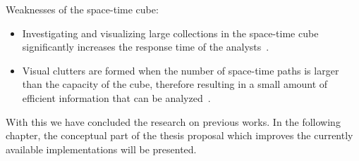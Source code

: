Weaknesses of the space-time cube:
\begin{itemize}
    \item Investigating and visualizing large collections in the space-time cube significantly increases the response time
    of the analysts~\citep{windhager2020many}.
    \item Visual clutters are formed when the number of space-time paths is larger than the capacity of the cube,
    therefore resulting in a small amount of efficient information that can be analyzed~\citep{song2021visualization}.
\end{itemize}

With this we have concluded the research on previous works. In the following chapter, the conceptual part of the thesis proposal which improves the
currently available implementations will be presented.

